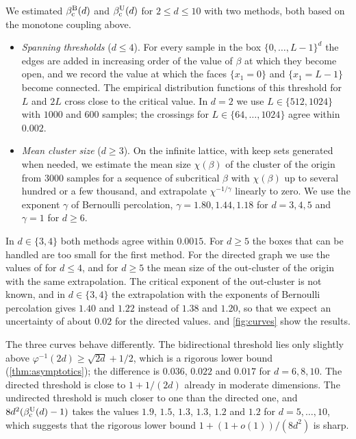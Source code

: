 \documentclass[11pt,letterpaper]{article}
\begin{document}
We estimated $\beta_{\mathrm c}^{\mathrm B}(d)$ and $\beta_{\mathrm c}^{\mathrm U}(d)$ for $2\le d\le10$ with two methods, both based on the monotone coupling above.
\begin{itemize}
\item \emph{Spanning thresholds} ($d\le4$). For every sample in the box $\{0,\dots,L-1\}^d$ the edges are added in increasing order of the value of $\beta$ at which they become open, and we record the value at which the faces $\{x_1=0\}$ and $\{x_1=L-1\}$ become connected. The empirical distribution functions of this threshold for $L$ and $2L$ cross close to the critical value. In $d=2$ we use $L\in\{512,1024\}$ with $1000$ and $600$ samples; the crossings for $L\in\{64,\dots,1024\}$ agree within $0.002$.
\item \emph{Mean cluster size} ($d\ge3$). On the infinite lattice, with keep sets generated when needed, we estimate the mean size $\chi(\beta)$ of the cluster of the origin from $3000$ samples for a sequence of subcritical $\beta$ with $\chi(\beta)$ up to several hundred or a few thousand, and extrapolate $\chi^{-1/\gamma}$ linearly to zero. We use the exponent $\gamma$ of Bernoulli percolation, $\gamma=1.80,1.44,1.18$ for $d=3,4,5$ and $\gamma=1$ for $d\ge6$.
\end{itemize}
In $d\in\{3,4\}$ both methods agree within $0.0015$. For $d\ge5$ the boxes that can be handled are too small for the first method. For the directed graph we use the values of \cite[Table~1]{CHJK26} for $d\le4$, and for $d\ge5$ the mean size of the out-cluster of the origin with the same extrapolation. The critical exponent of the out-cluster is not known, and in $d\in\{3,4\}$ the extrapolation with the exponents of Bernoulli percolation gives $1.40$ and $1.22$ instead of $1.38$ and $1.20$, so that we expect an uncertainty of about $0.02$ for the directed values.  and \cref{fig:curves} show the results.





The three curves behave differently. The bidirectional threshold lies only slightly above $\varphi^{-1}(2d)\ge\sqrt{2d}+1/2$, which is a rigorous lower bound (\cref{thm:asymptotics}); the difference is $0.036$, $0.022$ and $0.017$ for $d=6,8,10$. The directed threshold is close to $1+1/(2d)$ already in moderate dimensions. The undirected threshold is much closer to one than the directed one, and $8d^2(\beta_{\mathrm c}^{\mathrm U}(d)-1)$ takes the values $1.9$, $1.5$, $1.3$, $1.3$, $1.2$ and $1.2$ for $d=5,\dots,10$, which suggests that the rigorous lower bound $1+(1+o(1))/(8d^2)$ is sharp.
\end{document}
